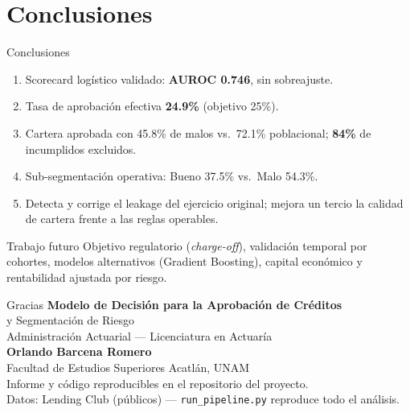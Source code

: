 \documentclass[10pt,aspectratio=169]{beamer}
\begin{document}
\section{Conclusiones}
\begin{frame}{Conclusiones}
  \begin{enumerate}
    \item Scorecard logístico validado: \textbf{AUROC 0.746}, sin sobreajuste.
    \item Tasa de aprobación efectiva \textbf{24.9\%} (objetivo 25\%).
    \item Cartera aprobada con 45.8\% de malos vs.\ 72.1\% poblacional;
          \textbf{84\%} de incumplidos excluidos.
    \item Sub-segmentación operativa: Bueno 37.5\% vs.\ Malo 54.3\%.
    \item Detecta y corrige el leakage del ejercicio original; mejora un
          tercio la calidad de cartera frente a las reglas operables.
  \end{enumerate}
  \vspace{0.8em}
  \begin{block}{Trabajo futuro}
    Objetivo regulatorio (\emph{charge-off}), validación temporal por
    cohortes, modelos alternativos (Gradient Boosting), capital económico y
    rentabilidad ajustada por riesgo.
  \end{block}
\end{frame}

\begin{frame}{Gracias}
  \centering
  \vspace{1.2em}
  {\Large\textbf{Modelo de Decisión para la Aprobación de Créditos}}\\[0.4em]
  {\large y Segmentación de Riesgo}\\[1.5em]
  Administración Actuarial --- Licenciatura en Actuaría\\[0.4em]
  \textbf{Orlando Barcena Romero}\\[0.4em]
  Facultad de Estudios Superiores Acatlán, UNAM\\[1.2em]
  \small
  Informe y código reproducibles en el repositorio del proyecto.\\[0.3em]
  Datos: Lending Club (públicos) --- \texttt{run\_pipeline.py} reproduce todo el análisis.
\end{frame}
\end{document}
